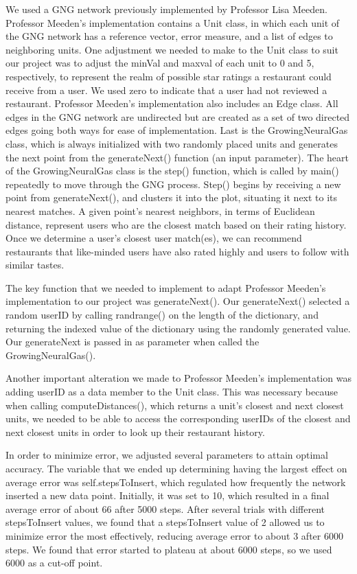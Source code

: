 \documentclass[12pt,letterpaper]{article}
\begin{document}
We used a GNG network previously implemented by Professor Lisa Meeden. Professor Meeden's implementation contains a Unit class, in which each unit of the GNG network has a reference vector, error measure, and a list of edges to neighboring units. One adjustment we needed to make to the Unit class to suit our project was to adjust the minVal and maxval of each unit to 0 and 5, respectively, to represent the realm of possible star ratings a restaurant could receive from a user. We used zero to indicate that a user had not reviewed a restaurant. Professor Meeden's implementation also includes an Edge class. All edges in the GNG network are undirected but are created as a set of two directed edges going both ways for ease of implementation. Last is the GrowingNeuralGas class, which is always initialized with two randomly placed units and generates the next point from the generateNext() function (an input parameter). The heart of the GrowingNeuralGas class is the step() function, which is called by main() repeatedly to move through the GNG process. Step() begins by receiving a new point from generateNext(), and clusters it into the plot, situating it next to its nearest matches. A given point's nearest neighbors, in terms of Euclidean distance, represent users who are the closest match based on their rating history. Once we determine a user's closest user match(es), we can recommend restaurants that like-minded users have also rated highly and users to follow with similar tastes. 

The key function that we needed to implement to adapt Professor Meeden's implementation to our project was generateNext(). Our generateNext() selected a random userID by calling randrange() on the length of the dictionary, and returning the indexed value of the dictionary using the randomly generated value. Our generateNext is passed in as parameter when called the GrowingNeuralGas().

Another important alteration we made to Professor Meeden's implementation was adding userID as a data member to the Unit class. This was necessary because when calling computeDistances(), which returns a unit's closest and next closest units, we needed to be able to access the corresponding userIDs of the closest and next closest units in order to look up their restaurant history. 

In order to minimize error, we adjusted several parameters to attain optimal accuracy. The variable that we ended up determining having the largest effect on average error was self.stepsToInsert, which regulated how frequently the network inserted a new data point. Initially, it was set to 10, which resulted in a final average error of about 66 after 5000 steps. After several trials with different stepsToInsert values, we found that a stepsToInsert value of 2 allowed us to minimize error the most effectively, reducing average error to about 3 after 6000 steps. We found that error started to plateau at about 6000 steps, so we used 6000 as a cut-off point. 
\end{document}
